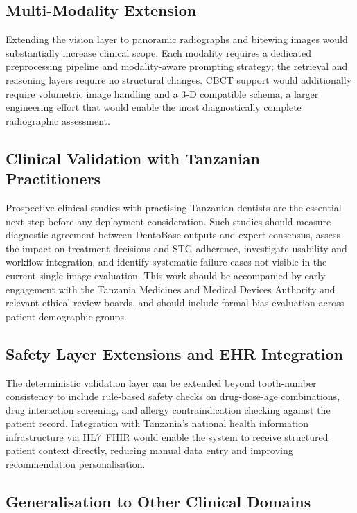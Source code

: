 \documentclass[12pt,a4paper]{report}
\begin{document}
\subsection{Multi-Modality Extension}

Extending the vision layer to panoramic radiographs and bitewing images would
substantially increase clinical scope. Each modality requires a dedicated
preprocessing pipeline and modality-aware prompting strategy; the retrieval
and reasoning layers require no structural changes. CBCT support would
additionally require volumetric image handling and a 3-D compatible schema,
a larger engineering effort that would enable the most diagnostically complete
radiographic assessment.

\subsection{Clinical Validation with Tanzanian Practitioners}

Prospective clinical studies with practising Tanzanian dentists are the
essential next step before any deployment consideration. Such studies should
measure diagnostic agreement between DentoBase outputs and expert consensus,
assess the impact on treatment decisions and STG adherence, investigate
usability and workflow integration, and identify systematic failure cases
not visible in the current single-image evaluation. This work should be
accompanied by early engagement with the Tanzania Medicines and Medical Devices
Authority and relevant ethical review boards, and should include formal bias
evaluation across patient demographic groups.

\subsection{Safety Layer Extensions and EHR Integration}

The deterministic validation layer can be extended beyond tooth-number
consistency to include rule-based safety checks on drug-dose-age combinations,
drug interaction screening, and allergy contraindication checking against the
patient record. Integration with Tanzania's national health information
infrastructure via HL7~FHIR would enable the system to receive structured
patient context directly, reducing manual data entry and improving recommendation
personalisation.

\subsection{Generalisation to Other Clinical Domains}
\end{document}
